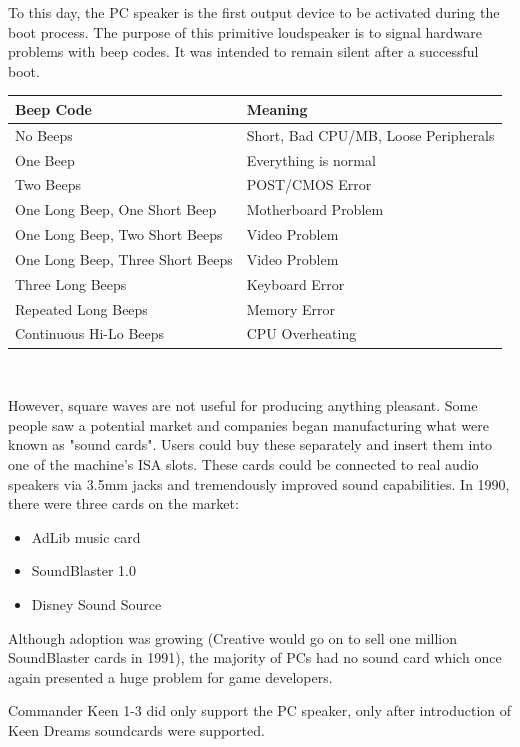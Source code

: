 \documentclass[book.tex]{subfiles}
\begin{document}
\par
 To this day, the PC speaker is the first output device to be activated during the boot process. The purpose of this primitive loudspeaker is to signal hardware problems with beep codes. It was intended to remain silent after a successful boot.\\
\par
\begin{tabularx}{\textwidth}{l l}
\textbf{Beep Code} & \textbf{Meaning}  \\ \hline
No Beeps                         & Short, Bad CPU/MB, Loose Peripherals \\ \hline
One Beep                         & Everything is normal\\ \hline
Two Beeps                        & POST/CMOS Error \\ \hline 
One Long Beep, One Short Beep    & Motherboard Problem \\ \hline
One Long Beep, Two Short Beeps   & Video Problem \\ \hline
One Long Beep, Three Short Beeps & Video Problem \\ \hline
Three Long Beeps                 & Keyboard Error \\ \hline
Repeated Long Beeps              & Memory Error \\ \hline
Continuous Hi-Lo Beeps           & CPU Overheating \\ \hline
\end{tabularx}\\
\bigskip
\par
However, square waves are not useful for producing anything pleasant. Some people saw a potential market and companies began manufacturing what were known as "sound cards". Users could buy these separately and insert them into one of the machine's ISA slots. These cards could be connected to real audio speakers via 3.5mm jacks and tremendously improved sound capabilities. In 1990, there were three cards on the market:\\
\par
\begin{itemize}
\item AdLib music card
\item SoundBlaster 1.0
\item Disney Sound Source
\end{itemize}
\par
Although adoption was growing (Creative would go on to sell one million SoundBlaster cards in 1991), the majority of PCs had no sound card which once again presented a huge problem for game developers. 
\par
Commander Keen 1-3 did only support the PC speaker, only after introduction of Keen Dreams soundcards were supported.
\end{document}
